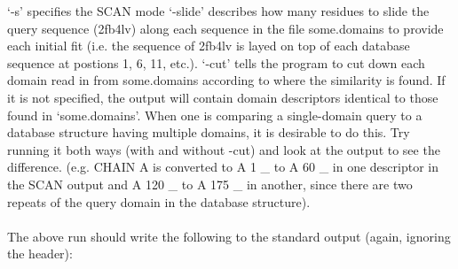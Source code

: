 `-s' specifies the SCAN mode `-slide' describes how many residues to slide the
query sequence (2fb4lv) along each sequence in the file some.domains to provide
each initial fit (i.e. the sequence of 2fb4lv is layed on top of each database
sequence at postions 1, 6, 11, etc.). `-cut' tells the program to cut down each
domain read in from some.domains according to where the similarity is found.  
If it is not specified, the output will contain domain descriptors identical to
those found in `some.domains'.  When one is comparing a single-domain query to
a database structure having multiple domains, it is desirable to do this.   Try running
it both ways (with and without -cut) and look at the output to see the difference.
(e.g. CHAIN A is converted to A 1 \_ to A 60 \_  in one descriptor in the SCAN
output and A 120 \_ to A 175 \_ in another, since there are two repeats of the
query domain in the database structure).\\
\\
The above run should write the following to the
standard output (again, ignoring the header):


